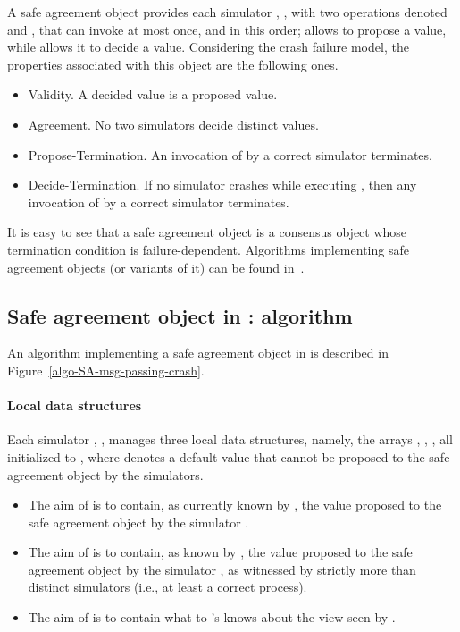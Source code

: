 \documentclass[11pt,letterpaper]{article}
\begin{document}
A safe agreement object provides each simulator ,
,  with two operations
denoted  and  , that  can invoke
at most once, and in this order;   allows  to propose
a value, while   allows it to decide a value.
Considering the crash failure model, the properties associated with this
object are the following ones.
\begin{itemize}
\vspace{-0.2cm}
\item Validity. A decided value is a proposed value.
\vspace{-0.2cm}
\item Agreement. No two simulators decide distinct values.
\vspace{-0.2cm}
\item Propose-Termination.
An invocation of   by a correct simulator terminates.
\vspace{-0.2cm}
\item Decide-Termination.
If no simulator crashes while executing  , then any
invocation of  by a correct simulator terminates.
\end{itemize}
It is easy to see that a safe agreement object is a consensus object whose
termination condition is failure-dependent. Algorithms implementing 
safe agreement
objects (or variants of it) can be found in~\cite{BG93,BGLR01,IR11-a}.


\subsection{Safe agreement object in : algorithm}
An algorithm implementing a safe agreement object in  is described
in Figure~\ref{algo-SA-msg-passing-crash}.

\paragraph{Local data structures}
Each simulator , , manages three local
data structures, namely, the arrays , ,
, all initialized to  , where
 denotes  a default value that cannot be proposed to the safe agreement
object  by the  simulators.
\begin{itemize}
\vspace{-0.2cm}
\item
The aim of  is to contain, as currently known by ,
the value proposed to the  safe agreement object by the simulator .
\vspace{-0.2cm}
\item
The aim of  is to contain, as known by , the value
proposed to the safe agreement object by the simulator , as witnessed
by  strictly more than   distinct simulators
(i.e., at least a correct process). 
\vspace{-0.2cm}
\item
The aim of  is to contain what to 's knows
about the view seen by  .
\end{itemize}
\end{document}
